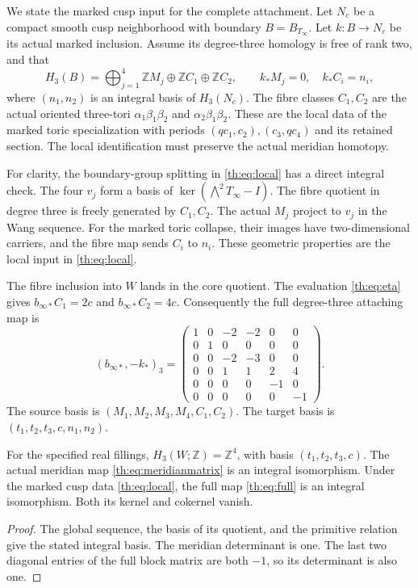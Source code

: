 We state the marked cusp input for the complete attachment.
Let $N_c$ be a compact smooth cusp neighborhood with boundary $B=B_{T_\infty}$.
Let $k:B\to N_c$ be its actual marked inclusion.
Assume its degree-three homology is free of rank two, and that
\begin{equation}\label{th:eq:local}
H_3(B)=
\bigoplus_{j=1}^4\mathbb ZM_j\oplus\mathbb ZC_1\oplus\mathbb ZC_2,
\qquad
k_*M_j=0,\quad k_*C_i=n_i,
\end{equation}
where $(n_1,n_2)$ is an integral basis of $H_3(N_c)$.
The fibre classes $C_1,C_2$ are the actual oriented three-tori
$\alpha_1\beta_1\beta_2$ and $\alpha_2\beta_1\beta_2$.
These are the local data of the marked toric specialization with periods
$(qc_1,c_2),(c_3,qc_4)$ and its retained section.
The local identification must preserve the actual meridian homotopy.

For clarity, the boundary-group splitting in \eqref{th:eq:local}
has a direct integral check.
The four $v_j$ form a basis of $\ker(\bigwedge^2T_\infty-I)$.
The fibre quotient in degree three is freely generated by $C_1,C_2$.
The actual $M_j$ project to $v_j$ in the Wang sequence.
For the marked toric collapse, their images have two-dimensional carriers,
and the fibre map sends $C_i$ to $n_i$.
These geometric properties are the local input in \eqref{th:eq:local}.

The fibre inclusion into $W$ lands in the core quotient.
The evaluation \eqref{th:eq:eta} gives
$b_{\infty*}C_1=2c$ and $b_{\infty*}C_2=4c$.
Consequently the full degree-three attaching map is
\begin{equation}\label{th:eq:full}
(b_{\infty*},-k_*)_3=
\begin{pmatrix}
1&0&-2&-2&0&0\\
0&1&0&0&0&0\\
0&0&-2&-3&0&0\\
0&0&1&1&2&4\\
0&0&0&0&-1&0\\
0&0&0&0&0&-1
\end{pmatrix}.
\end{equation}
The source basis is $(M_1,M_2,M_3,M_4,C_1,C_2)$.
The target basis is $(t_1,t_2,t_3,c,n_1,n_2)$.

\begin{theorem}\label{th:thm:third}
For the specified real fillings,
$H_3(W;\mathbb Z)=\mathbb Z^4$, with basis $(t_1,t_2,t_3,c)$.
The actual meridian map \eqref{th:eq:meridianmatrix} is an integral isomorphism.
Under the marked cusp data \eqref{th:eq:local}, the full map
\eqref{th:eq:full} is an integral isomorphism.
Both its kernel and cokernel vanish.
\end{theorem}
\begin{proof}
The global sequence, the basis of its quotient, and the primitive relation
give the stated integral basis.
The meridian determinant is one.
The last two diagonal entries of the full block matrix are both $-1$,
so its determinant is also one.
\end{proof}

